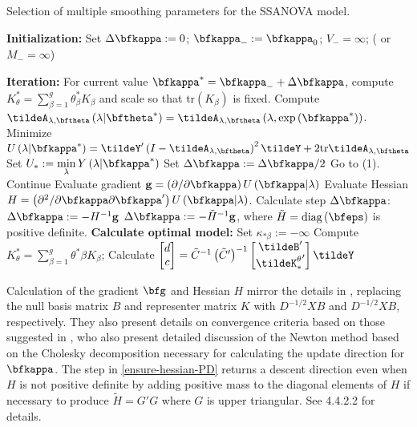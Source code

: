 \begin{algorithm}[H]
\caption{Selection of multiple smoothing parameters for the SSANOVA model.}\label{alg:SSANOVA-algorithm}
\begin{algorithmic}
\STATE \textbf{Initialization:} 
	\STATE Set $\Delta \bfkappa := 0$; \;$\bfkappa_{-}:=\bfkappa_{0}$; \;$V_- = \infty$; \;( or $M_- = \infty$)

\STATE \textbf{Iteration:} 
		\STATE For current value $\bfkappa^* = \bfkappa_- + \Delta \bfkappa$, compute $K^*_\theta = \sum_{\beta = 1}^g \theta^*_\beta K_\beta$ and scale so that $\mbox{tr}\left(K_\beta\right)$ is fixed. 
		\STATE Compute $\tildeA_{\lambda,\bftheta}\left(\lambda \vert \bftheta^* \right) = \tildeA_{\lambda,\bftheta}\left(\lambda, \exp\left({\bfkappa^*} \right)\right)$.
		\STATE Minimize $U\left(\lambda \vert \bfkappa^* \right) =  \tildeY'\left( I - \tildeA_{\lambda,\bftheta} \right)^2\tildeY + 2\mbox{tr}\tildeA_{\lambda,\bftheta} $
		\STATE Set $U_* := \min \limits_\lambda Y\left( \lambda \vert \bfkappa^* \right) $
		 		\STATE Set $\Delta \bfkappa := \Delta \bfkappa/2$
		 		\STATE Go to (1).
		\ELSE
		\STATE Continue
		\ENDIF
		\STATE Evaluate gradient $\mathbf{g} = \left(\partial /\partial \bfkappa\right) U\left(\bfkappa \vert \lambda\right)$
		\STATE Evaluate Hessian $H = \left(\partial^2 /\partial \bfkappa\partial \bfkappa' \right) U\left(\bfkappa \vert \lambda\right)$.
		\STATE Calculate step $\Delta \bfkappa$:
				\STATE $\Delta \bfkappa := -H^{-1} \mathbf{g}$
			\ELSE
				\STATE $\Delta \bfkappa := -\tilde{H}^{-1} \mathbf{g}$, where $\tilde{H} = \textup{diag}\left(\bfeps\right)$ is positive definite. \label{ensure-hessian-PD}
			\ENDIF
	\ENDWHILE
\STATE \textbf{Calculate optimal model:} 
		\STATE Set $\kappa_{*\beta} := -\infty$
	\ENDIF
	\STATE Compute $K^*_\theta = \sum_{\beta = 1}^g \theta^*{\beta} K_\beta$;
	\STATE Calculate $\begin{bmatrix} d \\ c \end{bmatrix} = \tilde{C}^{-1} \left(\tilde{C}'\right)^{-1} \begin{bmatrix} \tildeB' \\ {\tildeK_*^\theta}' \end{bmatrix} \tildeY$
\end{algorithmic}
\end{algorithm}

Calculation of the gradient $\bfg$ and Hessian $H$ mirror the details in \cite{gu1991minimizing}, replacing the null basis matrix $B$ and representer matrix $K$ with $D^{-1/2}XB$ and $D^{-1/2}XB$, respectively. They also present details on convergence criteria based on those suggested in \cite{gill1981practical}, who also present detailed discussion of the Newton method based on the Cholesky decomposition necessary for calculating the update direction for $\bfkappa$. The step in \ref{ensure-hessian-PD} returns a descent direction even when $H$ is not positive definite by adding positive mass to the diagonal elements of $H$ if necessary to produce $\tilde{H} = G'G$ where $G$ is upper triangular. See \cite{gill1981practical} 4.4.2.2 for details. 

